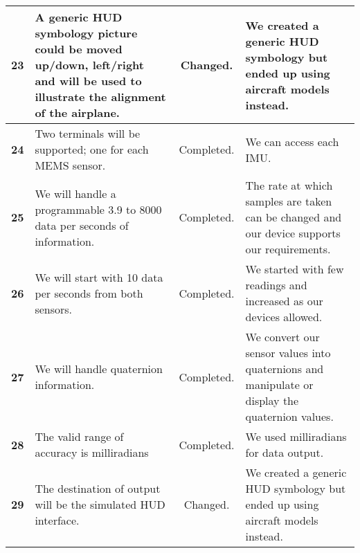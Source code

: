 \begin{center}
\begin{tabular}{|c|p{5cm}|c|p{5cm}|}
\textbf{23}
& A generic HUD symbology picture could be moved up/down, left/right and will be used to illustrate the alignment of the airplane.
& Changed.
& We created a generic HUD symbology but ended up using aircraft models instead.
\\ \hline
 
\textbf{24}
& Two terminals will be supported; one for each MEMS sensor.
& Completed.
& We can access each IMU.
\\ \hline
 
\textbf{25}
& We will handle a programmable 3.9 to 8000 data per seconds of information.
& Completed.
& The rate at which samples are taken can be changed and our device supports our requirements.
\\ \hline
 
\textbf{26}
& We will start with 10 data per seconds from both sensors.
& Completed.
& We started with few readings and increased as our devices allowed.
\\ \hline
 
\textbf{27}
& We will handle quaternion information.
& Completed.
& We convert our sensor values into quaternions and manipulate or display the quaternion values.
\\ \hline
 
\textbf{28}
& The valid range of accuracy is milliradians
& Completed.
& We used milliradians for data output.
\\ \hline
 
\textbf{29}
& The destination of output will be the simulated HUD interface.
& Changed.
& We created a generic HUD symbology but ended up using aircraft models instead.
\\ \hline
 
\end{tabular}
\end{center}
 
\hfill \break